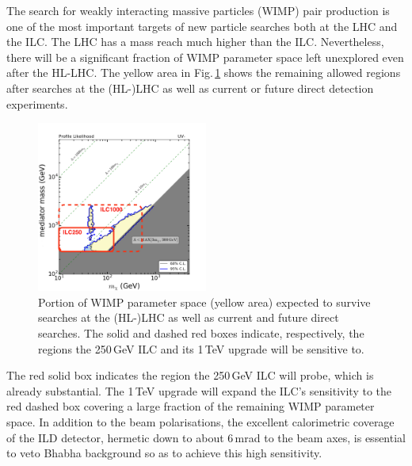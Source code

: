  The search for weakly interacting massive particles (WIMP) pair production is one of the most important targets of new particle searches both at the LHC and the ILC. The LHC has a mass reach much higher than the ILC. Nevertheless, there will be a significant fraction of WIMP parameter space left unexplored even after the HL-LHC. The yellow area in Fig.\,\ref{fig:WIMPleft} shows the remaining allowed regions after searches at the (HL-)LHC as well as current or future direct detection experiments\cite{Habermehl:2017dxh}.
\begin{figure}[htbp]
\begin{center}
 \includegraphics[width=0.5\textwidth]{Science/fig/UVminus_mx_lam_far_2ilc.pdf}
\end{center}
\caption{Portion of WIMP parameter space (yellow area) expected to survive searches at the (HL-)LHC as well as current and future direct searches. The solid and dashed red boxes indicate, respectively, the regions the 250\,GeV ILC and its 1\,TeV upgrade will be sensitive to\cite{Habermehl:2018yul}.
}
\label{fig:ilcWIMP}\label{fig:WIMPleft}
\end{figure}
The red solid box indicates the region the 250\,GeV ILC will probe, which is already substantial. The 1\,TeV upgrade will expand the ILC's sensitivity to the red dashed box covering a large fraction of the remaining WIMP parameter space\cite{Habermehl:2017dxh}. In addition to the beam polarisations, the excellent calorimetric coverage of the ILD detector, hermetic down to about 6\,mrad to the beam axes, is essential to veto Bhabha background so as to achieve this high sensitivity. 

